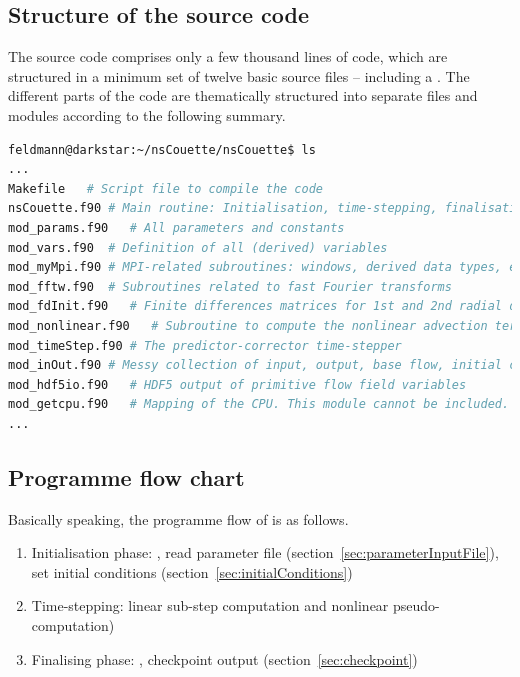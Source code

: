 \documentclass[a4paper, 11pt, DIV=11]{scrartcl}
\begin{document}
\subsection{Structure of the source code}
\label{sec:codeStructures}

The source code comprises only a few thousand lines of code, which are structured in
a minimum set of twelve basic source files -- including a . The different
parts of the code are thematically structured into separate files and \fortran modules
according to the following summary.
\begin{lstlisting}[language=bash]
feldmann@darkstar:~/nsCouette/nsCouette$ ls
...
Makefile   # Script file to compile the code
nsCouette.f90 # Main routine: Initialisation, time-stepping, finalisation
mod_params.f90   # All parameters and constants
mod_vars.f90  # Definition of all (derived) variables
mod_myMpi.f90 # MPI-related subroutines: windows, derived data types, etc.
mod_fftw.f90  # Subroutines related to fast Fourier transforms
mod_fdInit.f90   # Finite differences matrices for 1st and 2nd radial derivatives
mod_nonlinear.f90   # Subroutine to compute the nonlinear advection term (pseudo-spectral) 
mod_timeStep.f90 # The predictor-corrector time-stepper
mod_inOut.f90 # Messy collection of input, output, base flow, initial conditions
mod_hdf5io.f90   # HDF5 output of primitive flow field variables
mod_getcpu.f90   # Mapping of the CPU. This module cannot be included.
...
\end{lstlisting}

\subsection{Programme flow chart}
\label{sec:programmeFlowChart}

Basically speaking, the programme flow of \nsc is as follows.
\begin{enumerate}
\item Initialisation phase: \mpi, read parameter file (section~\ref{sec:parameterInputFile}), set initial conditions (section~\ref{sec:initialConditions}) 
\item Time-stepping: linear sub-step computation and nonlinear pseudo-computation)
\item Finalising phase: \mpi, checkpoint output (section~\ref{sec:checkpoint})
\end{enumerate}
\end{document}
